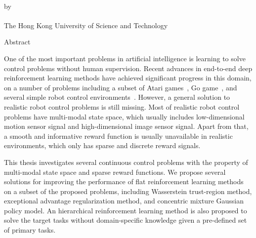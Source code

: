 \begin{center}
{\Large \thesistitle}\\
\vspace{20mm}
by \thesisauthor\\
\vspace{15mm}
\departmentname\\
\vspace{10mm}
The Hong Kong University of Science and Technology
\end{center}
\vspace{8mm}
\begin{center}
Abstract
\end{center}
One of the most important problems in artificial intelligence is learning to solve control problems without human supervision. Recent advances in end-to-end deep reinforcement learning methods have achieved significant progress in this domain, on a number of problems including a subset of Atari games~\cite{mnih2015human}, Go game~\cite{silver2016mastering}, and several simple robot control environments~\cite{duan2016benchmarking}.  However, a general solution to realistic robot control problems is still missing. Most of realistic robot control problems have multi-modal state space, which usually includes low-dimensional motion sensor signal and high-dimensional image sensor signal. Apart from that, a smooth and informative reward function is usually unavailable in realistic environments, which only has sparse and discrete reward signals.

This thesis investigates several continuous control problems with the property of multi-modal state space and sparse reward functions. We propose several solutions for improving the performance of flat reinforcement learning methods on a subset of the proposed problems, including Wasserstein trust-region method, exceptional advantage regularization method, and concentric mixture Gaussian policy model. An hierarchical reinforcement learning method is also proposed to solve the target tasks without domain-specific knowledge given a pre-defined set of primary tasks. 

\par
\noindent


